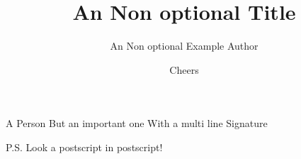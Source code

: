 \documentclass{dragonfly-letter}
\title{An Non optional Title}
\author{An Non optional Example Author}
\begin{document}
\lipsum[1-7]

\signature{Cheers}{
A Person
But an important one
With a multi line
Signature
}

P.S. Look a postscript in postscript!
\end{document}
